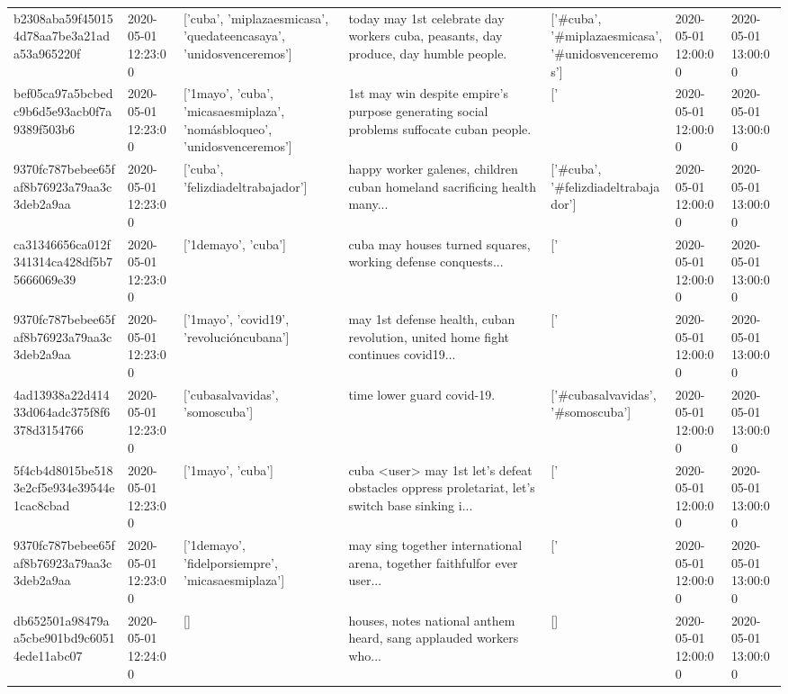 \begin{tabular}{lllllll}
b2308aba59f450154d78aa7be3a21ada53a965220f & 2020-05-01 12:23:00 & ['cuba', 'miplazaesmicasa', 'quedateencasaya', 'unidosvenceremos'] & today may 1st celebrate day workers cuba, peasants, day produce, day humble people. & ['#cuba', '#miplazaesmicasa', '#unidosvenceremos'] & 2020-05-01 12:00:00 & 2020-05-01 13:00:00 \\
bef05ca97a5bcbedc9b6d5e93acb0f7a9389f503b6 & 2020-05-01 12:23:00 & ['1mayo', 'cuba', 'micasaesmiplaza', 'nomásbloqueo', 'unidosvenceremos'] & 1st may win despite empire's purpose generating social problems suffocate cuban people. & ['#1mayo', '#cuba', '#micasaesmiplaza', '#unidosvenceremos'] & 2020-05-01 12:00:00 & 2020-05-01 13:00:00 \\
9370fc787bebee65faf8b76923a79aa3c3deb2a9aa & 2020-05-01 12:23:00 & ['cuba', 'felizdiadeltrabajador'] & happy worker galenes, children cuban homeland sacrificing health many... & ['#cuba', '#felizdiadeltrabajador'] & 2020-05-01 12:00:00 & 2020-05-01 13:00:00 \\
ca31346656ca012f341314ca428df5b75666069e39 & 2020-05-01 12:23:00 & ['1demayo', 'cuba'] & cuba may houses turned squares, working defense conquests... & ['#1demayo', '#cuba'] & 2020-05-01 12:00:00 & 2020-05-01 13:00:00 \\
9370fc787bebee65faf8b76923a79aa3c3deb2a9aa & 2020-05-01 12:23:00 & ['1mayo', 'covid19', 'revolucióncubana'] & may 1st defense health, cuban revolution, united home fight continues covid19... & ['#1mayo', '#covid19', '#revolucióncubana'] & 2020-05-01 12:00:00 & 2020-05-01 13:00:00 \\
4ad13938a22d41433d064adc375f8f6378d3154766 & 2020-05-01 12:23:00 & ['cubasalvavidas', 'somoscuba'] & time lower guard covid-19. & ['#cubasalvavidas', '#somoscuba'] & 2020-05-01 12:00:00 & 2020-05-01 13:00:00 \\
5f4cb4d8015be5183e2cf5e934e39544e1cac8cbad & 2020-05-01 12:23:00 & ['1mayo', 'cuba'] & cuba <user> may 1st let's defeat obstacles oppress proletariat, let's switch base sinking i... & ['#1mayo', '#cuba'] & 2020-05-01 12:00:00 & 2020-05-01 13:00:00 \\
9370fc787bebee65faf8b76923a79aa3c3deb2a9aa & 2020-05-01 12:23:00 & ['1demayo', 'fidelporsiempre', 'micasaesmiplaza'] & may sing together international arena, together faithfulfor ever user... & ['#1demayo', '#fidelporsiempre', '#micasaesmiplaza'] & 2020-05-01 12:00:00 & 2020-05-01 13:00:00 \\
db652501a98479aa5cbe901bd9c60514ede11abc07 & 2020-05-01 12:24:00 & [] & houses, notes national anthem heard, sang applauded workers who... & [] & 2020-05-01 12:00:00 & 2020-05-01 13:00:00 \\

\end{tabular}
